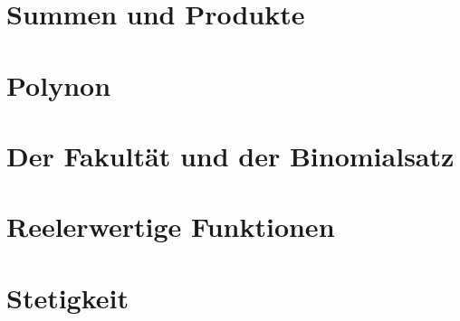 \documentclass[12pt, twoside, openright]{report}
\theoremstyle{definition} %
\theoremstyle{definition} %
\theoremstyle{definition} %
\theoremstyle{definition} %
\theoremstyle{definition} %
\theoremstyle{remark} %
\begin{document}
		\section{Summen und Produkte}
		
		
		\section{Polynon}
		
		\section{Der Fakultät und der Binomialsatz}
		
		\section{Reelerwertige Funktionen}
		
		\section{Stetigkeit}
	
\end{document}
